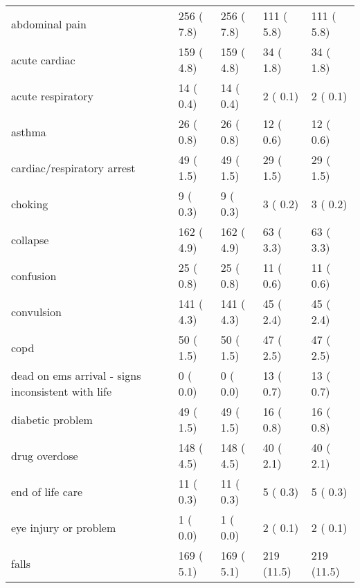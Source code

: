 \documentclass[
  a4paper,
  openany]{article}
\begin{document}
\begin{longtable}[t]{lllll}
\hspace{1em}abdominal pain & 256 ( 7.8) & 256 ( 7.8) & 111 ( 5.8) & 111 ( 5.8)\\
\rowcolor{gray!6}  \hspace{1em}acute cardiac & 159 ( 4.8) & 159 ( 4.8) & 34 ( 1.8) & 34 ( 1.8)\\
\hspace{1em}acute respiratory & 14 ( 0.4) & 14 ( 0.4) & 2 ( 0.1) & 2 ( 0.1)\\
\rowcolor{gray!6}  \hspace{1em}asthma & 26 ( 0.8) & 26 ( 0.8) & 12 ( 0.6) & 12 ( 0.6)\\
\hspace{1em}cardiac/respiratory arrest & 49 ( 1.5) & 49 ( 1.5) & 29 ( 1.5) & 29 ( 1.5)\\
\rowcolor{gray!6}  \hspace{1em}choking & 9 ( 0.3) & 9 ( 0.3) & 3 ( 0.2) & 3 ( 0.2)\\
\hspace{1em}collapse & 162 ( 4.9) & 162 ( 4.9) & 63 ( 3.3) & 63 ( 3.3)\\
\rowcolor{gray!6}  \hspace{1em}confusion & 25 ( 0.8) & 25 ( 0.8) & 11 ( 0.6) & 11 ( 0.6)\\
\hspace{1em}convulsion & 141 ( 4.3) & 141 ( 4.3) & 45 ( 2.4) & 45 ( 2.4)\\
\rowcolor{gray!6}  \hspace{1em}copd & 50 ( 1.5) & 50 ( 1.5) & 47 ( 2.5) & 47 ( 2.5)\\
\hspace{1em}dead on ems arrival - signs inconsistent with life & 0 ( 0.0) & 0 ( 0.0) & 13 ( 0.7) & 13 ( 0.7)\\
\rowcolor{gray!6}  \hspace{1em}diabetic problem & 49 ( 1.5) & 49 ( 1.5) & 16 ( 0.8) & 16 ( 0.8)\\
\hspace{1em}drug overdose & 148 ( 4.5) & 148 ( 4.5) & 40 ( 2.1) & 40 ( 2.1)\\
\rowcolor{gray!6}  \hspace{1em}end of life care & 11 ( 0.3) & 11 ( 0.3) & 5 ( 0.3) & 5 ( 0.3)\\
\hspace{1em}eye injury or problem & 1 ( 0.0) & 1 ( 0.0) & 2 ( 0.1) & 2 ( 0.1)\\
\rowcolor{gray!6}  \hspace{1em}falls & 169 ( 5.1) & 169 ( 5.1) & 219 (11.5) & 219 (11.5)\\

\end{longtable}
\end{document}
